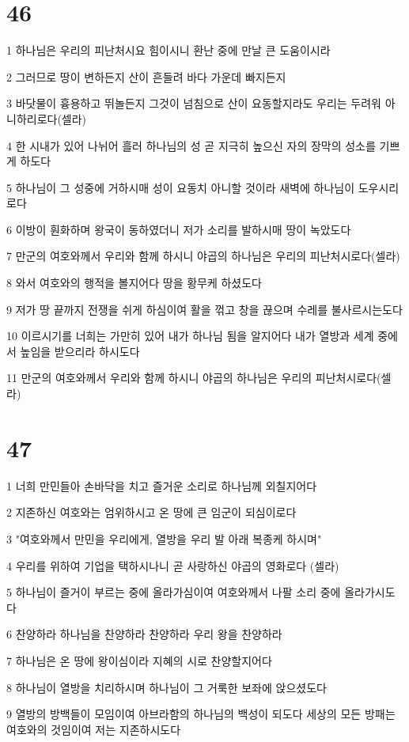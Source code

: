 \chapter{46}

\par 1 하나님은 우리의 피난처시요 힘이시니 환난 중에 만날 큰 도움이시라
\par 2 그러므로 땅이 변하든지 산이 흔들려 바다 가운데 빠지든지
\par 3 바닷물이 흉용하고 뛰놀든지 그것이 넘침으로 산이 요동할지라도 우리는 두려워 아니하리로다(셀라)
\par 4 한 시내가 있어 나뉘어 흘러 하나님의 성 곧 지극히 높으신 자의 장막의 성소를 기쁘게 하도다
\par 5 하나님이 그 성중에 거하시매 성이 요동치 아니할 것이라 새벽에 하나님이 도우시리로다
\par 6 이방이 훤화하며 왕국이 동하였더니 저가 소리를 발하시매 땅이 녹았도다
\par 7 만군의 여호와께서 우리와 함께 하시니 야곱의 하나님은 우리의 피난처시로다(셀라)
\par 8 와서 여호와의 행적을 볼지어다 땅을 황무케 하셨도다
\par 9 저가 땅 끝까지 전쟁을 쉬게 하심이여 활을 꺾고 창을 끊으며 수레를 불사르시는도다
\par 10 이르시기를 너희는 가만히 있어 내가 하나님 됨을 알지어다 내가 열방과 세계 중에서 높임을 받으리라 하시도다
\par 11 만군의 여호와께서 우리와 함께 하시니 야곱의 하나님은 우리의 피난처시로다(셀라)

\chapter{47}

\par 1 너희 만민들아 손바닥을 치고 즐거운 소리로 하나님께 외칠지어다
\par 2 지존하신 여호와는 엄위하시고 온 땅에 큰 임군이 되심이로다
\par 3 "여호와께서 만민을 우리에게, 열방을 우리 발 아래 복종케 하시며"
\par 4 우리를 위하여 기업을 택하시나니 곧 사랑하신 야곱의 영화로다 (셀라)
\par 5 하나님이 즐거이 부르는 중에 올라가심이여 여호와께서 나팔 소리 중에 올라가시도다
\par 6 찬양하라 하나님을 찬양하라 찬양하라 우리 왕을 찬양하라
\par 7 하나님은 온 땅에 왕이심이라 지혜의 시로 찬양할지어다
\par 8 하나님이 열방을 치리하시며 하나님이 그 거룩한 보좌에 앉으셨도다
\par 9 열방의 방백들이 모임이여 아브라함의 하나님의 백성이 되도다 세상의 모든 방패는 여호와의 것임이여 저는 지존하시도다

